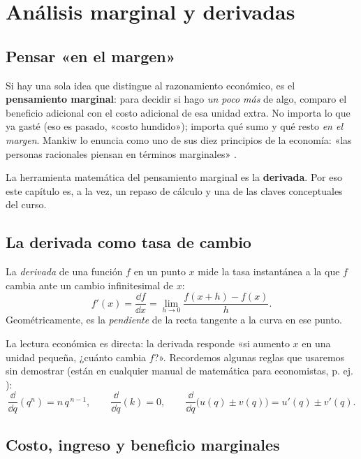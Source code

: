 \chapter{Análisis marginal y derivadas}
\label{cap:marginal}

\section{Pensar «en el margen»}

Si hay una sola idea que distingue al razonamiento económico, es el \textbf{pensamiento marginal}: para decidir si hago \emph{un poco más} de algo, comparo el beneficio adicional con el costo adicional de esa unidad extra. No importa lo que ya gasté (eso es pasado, «costo hundido»); importa qué sumo y qué resto \emph{en el margen}. Mankiw lo enuncia como uno de sus diez principios de la economía: «las personas racionales piensan en términos marginales» \cite{mankiw}.

La herramienta matemática del pensamiento marginal es la \textbf{derivada}. Por eso este capítulo es, a la vez, un repaso de cálculo y una de las claves conceptuales del curso.

\section{La derivada como tasa de cambio}

\begin{definicion}[Derivada]
La \emph{derivada} de una función $f$ en un punto $x$ mide la tasa instantánea a la que $f$ cambia ante un cambio infinitesimal de $x$:
\[
f'(x) = \frac{\dd f}{\dd x} = \lim_{h\to 0}\frac{f(x+h)-f(x)}{h}.
\]
Geométricamente, es la \emph{pendiente} de la recta tangente a la curva en ese punto.
\end{definicion}

La lectura económica es directa: la derivada responde «si aumento $x$ en una unidad pequeña, ¿cuánto cambia $f$?». Recordemos algunas reglas que usaremos sin demostrar (están en cualquier manual de matemática para economistas, p. ej. \cite{sydsaeter}):
\[
\frac{\dd}{\dd q}(q^n) = n\,q^{\,n-1}, \qquad
\frac{\dd}{\dd q}(k) = 0, \qquad
\frac{\dd}{\dd q}\big(u(q)\pm v(q)\big) = u'(q)\pm v'(q).
\]

\section{Costo, ingreso y beneficio marginales}

